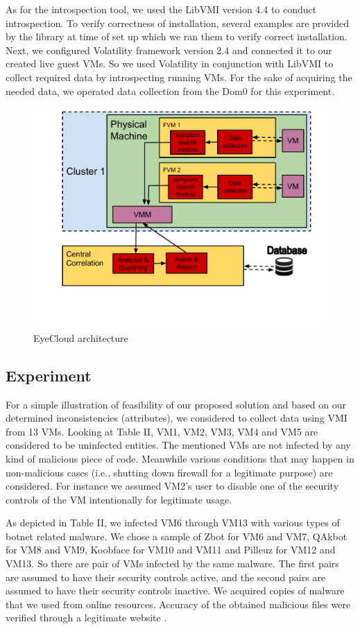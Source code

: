 \documentclass[conference]{IEEEtran}
\begin{document}
As for the introspection tool, we used the LibVMI version 4.4 to conduct introspection. To verify correctness of installation, several examples are provided by the library at time of set up which we ran them to verify correct installation. Next, we configured Volatility framework version 2.4 and connected it to our created live guest VMs. So we used Volatility in conjunction with LibVMI to collect required data by introspecting running VMs. For the sake of acquiring the needed data, we operated data collection from the Dom0 for this experiment.    
\begin{figure}
\hspace{-1.5cm}
\includegraphics[scale=0.5]{pic114.pdf}
\caption{EyeCloud architecture}
\label{Fig:114}
\end{figure}
\subsection{Experiment}
For a simple illustration of feasibility of our proposed solution and based on our determined inconsistencies (attributes), we considered to collect data using VMI from 13 VMs. Looking at Table II, VM1, VM2, VM3, VM4 and VM5 are considered to be uninfected entities. The mentioned VMs are not infected by any kind of malicious piece of code. Meanwhile various conditions that may happen in non-malicious cases (i.e., shutting down firewall for a legitimate purpose) are considered. For instance we assumed VM2's user to disable one of the security controls of the VM intentionally for legitimate usage.   

As depicted in Table II, we infected VM6 through VM13 with various types of botnet related malware. We chose a sample of Zbot for VM6 and VM7, QAkbot for VM8 and VM9, Koobface for VM10 and VM11 and Pilleuz for VM12 and VM13. So there are pair of VMs infected by the same malware. The first pairs are assumed to have their security controls active, and the second pairs are assumed to have their security controls inactive. We acquired copies of malware that we used from online resources. Accuracy of the obtained malicious files were verified through a legitimate website \cite{ref45}.
\end{document}
